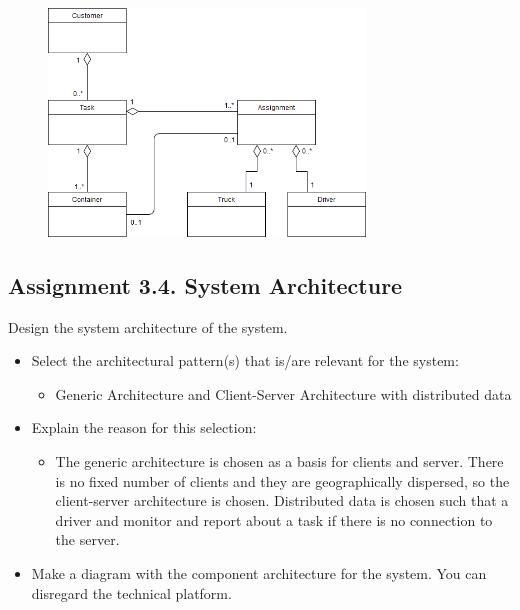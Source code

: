 \begin{figure}[H]
    \centering
    \includegraphics[width=0.75\textwidth]{figures/assignment3-3classdiagram2018.png}
\end{figure}

\subsection{Assignment 3.4. System Architecture}
Design the system architecture of the system.
\begin{itemize}
    \item Select the architectural pattern(s) that is/are relevant for the system:
    \begin{itemize}
        \item Generic Architecture and Client-Server Architecture with distributed data
    \end{itemize}
    \item Explain the reason for this selection:
    \begin{itemize}
        \item The generic architecture is chosen as a basis for clients and server. There is no fixed number of clients and they are geographically dispersed, so the client-server architecture is chosen. Distributed data is chosen such that a driver and monitor and report about a task if there is no connection to the server.
    \end{itemize}
    \item Make a diagram with the component architecture for the system. You can disregard the technical platform.
\end{itemize}


